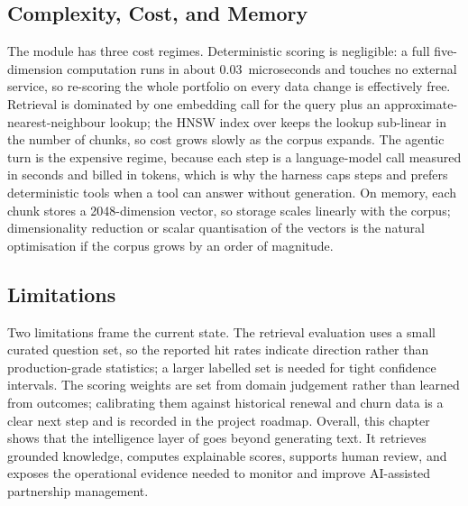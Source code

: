 \subsection{Complexity, Cost, and Memory}
\label{subsec:chapter7-complexity}
The module has three cost regimes. Deterministic scoring is negligible: a full five-dimension computation runs in about 0.03~microseconds and touches no external service, so re-scoring the whole portfolio on every data change is effectively free. Retrieval is dominated by one embedding call for the query plus an approximate-nearest-neighbour lookup; the HNSW index over  keeps the lookup sub-linear in the number of chunks, so cost grows slowly as the corpus expands. The agentic turn is the expensive regime, because each step is a language-model call measured in seconds and billed in tokens, which is why the harness caps steps and prefers deterministic tools when a tool can answer without generation. On memory, each chunk stores a 2048-dimension vector, so storage scales linearly with the corpus; dimensionality reduction or scalar quantisation of the vectors is the natural optimisation if the corpus grows by an order of magnitude.
\subsection{Limitations}
\label{subsec:chapter7-limitations}
Two limitations frame the current state. The retrieval evaluation uses a small curated question set, so the reported hit rates indicate direction rather than production-grade statistics; a larger labelled set is needed for tight confidence intervals. The scoring weights are set from domain judgement rather than learned from outcomes; calibrating them against historical renewal and churn data is a clear next step and is recorded in the project roadmap.
Overall, this chapter shows that the intelligence layer of \projectname{} goes beyond generating text. It retrieves grounded knowledge, computes explainable scores, supports human review, and exposes the operational evidence needed to monitor and improve AI-assisted partnership management.

